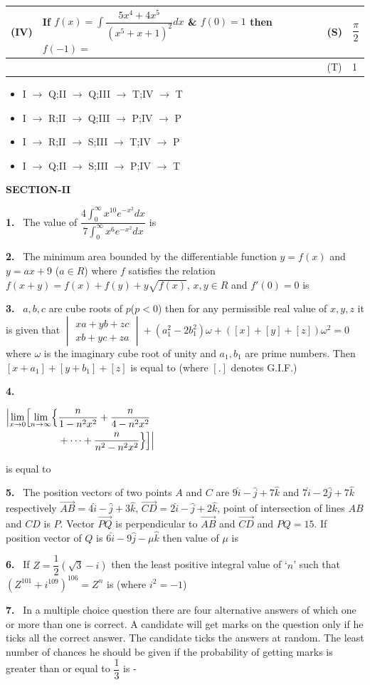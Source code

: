 \documentclass[10pt]{extarticle}
\newcommand{\sect}[1]{\par\smallskip\noindent\textbf{#1}\par}
\newcommand{\qn}[1]{\par\smallskip\noindent\textbf{#1.}~}
\newenvironment{qoptions}{\begin{itemize}[leftmargin=1.8em,itemsep=1pt,topsep=2pt,label={}]}{\end{itemize}}
\newcommand{\opt}[2]{\item[(#1)] #2}
\begin{document}
\begin{multicols}{2}
\begin{center}
\begin{tabular}{|L{0.6cm}L{4.6cm}|L{0.6cm}L{1.0cm}|}
(IV)&If $f(x)=\displaystyle\int\dfrac{5x^4+4x^5}{(x^5+x+1)^2}dx$ \& $f(0)=1$ then $f(-1)=$&(S)&$\dfrac\pi2$\\\hline
&&(T)&1\\\hline
\end{tabular}\end{center}
\begin{qoptions}
\opt{A}{I $\to$ Q;II $\to$ Q;III $\to$ T;IV $\to$ T}
\opt{B}{I $\to$ R;II $\to$ Q;III $\to$ P;IV $\to$ P}
\opt{C}{I $\to$ R;II $\to$ S;III $\to$ T;IV $\to$ P}
\opt{D}{I $\to$ Q;II $\to$ S;III $\to$ P;IV $\to$ T}
\end{qoptions}
\sect{SECTION-II}
\qn{1} The value of $\dfrac{4\displaystyle\int_0^\infty x^{10}e^{-x^2}dx}{7\displaystyle\int_0^\infty x^{6}e^{-x^2}dx}$ is
\qn{2} The minimum area bounded by the differentiable function $y=f(x)$ and $y=ax+9$ ($a\in R$) where $f$ satisfies the relation $f(x+y)=f(x)+f(y)+y\sqrt{f(x)}$, $x,y\in R$ and $f'(0)=0$ is
\qn{3} $a,b,c$ are cube roots of $p$($p<0$) then for any permissible real value of $x,y,z$ it is given that $\begin{vmatrix}xa+yb+zc\\xb+yc+za\end{vmatrix}+\left(a_1^2-2b_1^2\right)\omega+([x]+[y]+[z])\omega^2=0$ where $\omega$ is the imaginary cube root of unity and $a_1,b_1$ are prime numbers. Then $[x+a_1]+[y+b_1]+[z]$ is equal to (where $[.]$ denotes G.I.F.)
\qn{4} \par\noindent\hfill$\displaystyle\begin{aligned}\Bigl|\lim_{x\to0}\Bigl[\lim_{n\to\infty}\Bigl\{&\dfrac n{1-n^2x^2}+\dfrac n{4-n^2x^2}\\&+\dots+\dfrac n{n^2-n^2x^2}\Bigr\}\Bigr]\Bigr|\end{aligned}$\hfill\null\par
is equal to
\qn{5} The position vectors of two points $A$ and $C$ are $9\hat i-\hat j+7\hat k$ and $7\hat i-2\hat j+7\hat k$ respectively $\overrightarrow{AB}=4\hat i-\hat j+3\hat k$, $\overrightarrow{CD}=2\hat i-\hat j+2\hat k$, point of intersection of lines $AB$ and $CD$ is $P$. Vector $\overrightarrow{PQ}$ is perpendicular to $\overrightarrow{AB}$ and $\overrightarrow{CD}$ and $PQ=15$. If position vector of $Q$ is $6\hat i-9\hat j-\mu\hat k$ then value of $\mu$ is
\qn{6} If $Z=\dfrac12\left(\sqrt3-i\right)$ then the least positive integral value of `$n$' such that $\left(Z^{101}+i^{109}\right)^{106}=Z^n$ is (where $i^2=-1$)
\qn{7} In a multiple choice question there are four alternative answers of which one or more than one is correct. A candidate will get marks on the question only if he ticks all the correct answer. The candidate ticks the answers at random. The least number of chances he should be given if the probability of getting marks is greater than or equal to $\dfrac13$ is -

\end{multicols}
\end{document}
